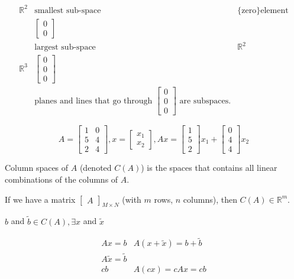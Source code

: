 \documentclass[12pt]{article}
\newcommand{\bbR}{\mathds{R}}
\newcommand{\<}{\langle}
\renewcommand{\>}{\rangle}
\begin{document}
\[
	\begin{matrix}
		\bbR^2 & \text{smallest sub-space} & \text{\{zero\} element} \\
		 & \begin{bmatrix}
		 	0 \\ 0
		 \end{bmatrix} \\
		 & \text{largest sub-space} & \bbR^2 \\\hline
		 \bbR^3 & \begin{bmatrix}
		 	0 \\ 0 \\0 
		 \end{bmatrix} \\
		 & \text{planes and lines that go through } \begin{bmatrix}
		 	0 \\ 0 \\ 0
		 \end{bmatrix} \text{ are subspaces.}
	\end{matrix}
\]

\[
	A = \begin{bmatrix}
		1 & 0 \\ 5 & 4 \\ 2 & 4
	\end{bmatrix},
	x = \begin{bmatrix}
		x_1 \\ x_2
	\end{bmatrix}, 
	Ax = \begin{bmatrix}
		1 \\ 5 \\ 2 
	\end{bmatrix} x_1 + 
	\begin{bmatrix}
		0 \\ 4 \\ 4
	\end{bmatrix} x_2
\]

Column spaces of $A$ (denoted $C(A)$) is the spaces that contains all linear combinations of the columns of $A$.

If we have a matrix $\begin{bmatrix}A\end{bmatrix}_{M \times N}$ (with $m$ rows, $n$ columns), then $C(A) \in \bbR^m$.

$b$ and $\tilde{b} \in C(A), \exists x$ and $\tilde{x}$

\[
	\begin{matrix}
		Ax = b & A(x+\tilde{x}) = b + \tilde{b}\\
		A \tilde{x}  = \tilde{b} \\
		c b & A(cx) = cAx = cb
	\end{matrix}
\]	
\end{document}
